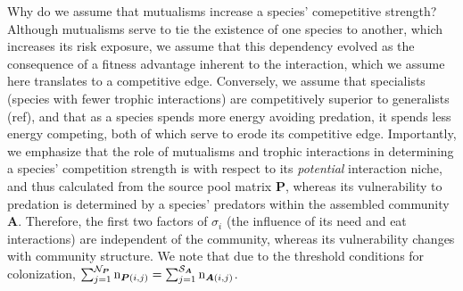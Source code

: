 \documentclass[twocolumn,preprintnumbers,amsmath,amssymb,superscriptaddress]{revtex4}
\newcommand{\rr}[1]{{\rm #1}}
\begin{document}
Why do we assume that mutualisms increase a species' comepetitive strength?
Although mutualisms serve to tie the existence of one species to another, which increases its risk exposure, we assume that this dependency evolved as the consequence of a fitness advantage inherent to the interaction, which we assume here translates to a competitive edge.
Conversely, we assume that specialists (species with fewer trophic interactions) are competitively superior to generalists (ref), and that as a species spends more energy avoiding predation, it spends less energy competing, both of which serve to erode its competitive edge.
Importantly, we emphasize that the role of mutualisms and trophic interactions in determining a species' competition strength is with respect to its \emph{potential} interaction niche, and thus calculated from the source pool matrix $\bm P$, whereas its vulnerability to predation is determined by a species' predators within the assembled community $\bm A$.
Therefore, the first two factors of $\sigma_i$ (the influence of its need and eat interactions) are independent of the community, whereas its vulnerability changes with community structure.
We note that due to the threshold conditions for colonization, $\sum_{j=1}^{\mathcal{N}_{\bm P}} \rr{n}_{{\bm P}(i,j)} = \sum_{j=1}^{\mathcal{S}_{\bm A}} \rr{n}_{{\bm A}(i,j)}$.
\end{document}
